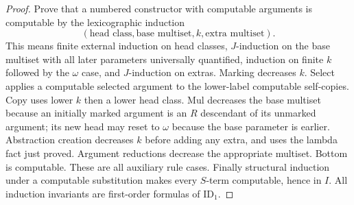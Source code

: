 \documentclass[11pt,a4paper]{article}
\begin{document}
\begin{proof}
Prove that a numbered constructor with computable arguments is computable
by the lexicographic induction
\[
 (\text{head class},\text{base multiset},k,\text{extra multiset}).
\]
This means finite external induction on head classes, $J$-induction on the
base multiset with all later parameters universally quantified, induction
on finite $k$ followed by the $\omega$ case, and $J$-induction on extras.
Marking decreases $k$.  Select applies a computable selected argument to the
lower-label computable self-copies.  Copy uses lower $k$ then a lower head
class.  Mul decreases the base multiset because an initially marked
argument is an $R$ descendant of its unmarked argument; its new head may
reset to $\omega$ because the base parameter is earlier.  Abstraction creation
decreases $k$ before adding any extra, and uses the lambda fact just proved.
Argument reductions decrease the appropriate multiset.  Bottom is computable.
These are all auxiliary rule cases.  Finally structural induction under a
computable substitution makes every $S$-term computable, hence in $I$.
All induction invariants are first-order formulas of $\mathrm{ID}_1$.
\end{proof}
\end{document}
